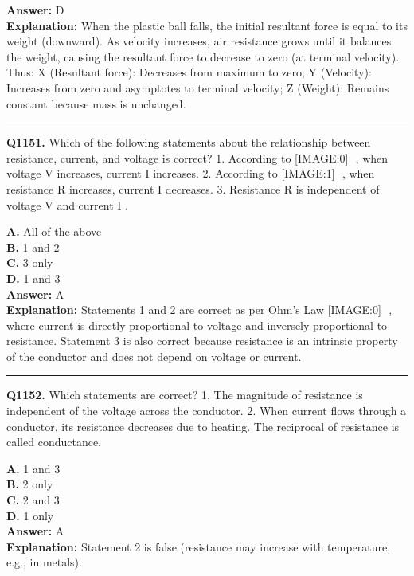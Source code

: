 \documentclass[12pt]{article}
\begin{document}
\textbf{Answer:} D \\
\textbf{Explanation:} When the plastic ball falls, the initial resultant force is equal to its weight (downward). As velocity increases, air resistance grows until it balances the weight, causing the resultant force to decrease to zero (at terminal velocity).
Thus:
X (Resultant force): Decreases from maximum to zero;
Y (Velocity): Increases from zero and asymptotes to terminal velocity;
Z (Weight): Remains constant because mass is unchanged.

\hrule
\vspace{1em}


\noindent
\textbf{Q1151.} Which of the following statements about the relationship between resistance, current, and voltage is correct?
1.
According to
[IMAGE:0]
​
, when voltage
V
increases, current
I
increases.
2.
According to
[IMAGE:1]
​
, when resistance
R
increases, current
I
decreases.
3.
Resistance
R
is independent of voltage
V
and current
I
.



\textbf{A.} All of the above \\
\textbf{B.} 1 and 2 \\
\textbf{C.} 3 only \\
\textbf{D.} 1 and 3 \\

\textbf{Answer:} A \\
\textbf{Explanation:} Statements 1 and 2 are correct as per Ohm's Law
[IMAGE:0]
​
, where current is directly proportional to voltage and inversely proportional to resistance. Statement 3 is also correct because resistance is an intrinsic property of the conductor and does not depend on voltage or current.

\hrule
\vspace{1em}


\noindent
\textbf{Q1152.} Which statements are correct?
1.
The magnitude of resistance is independent of the voltage across the conductor.
2.
When current flows through a conductor, its resistance decreases due to heating.
The reciprocal of resistance is called conductance.



\textbf{A.} 1 and 3 \\
\textbf{B.} 2 only \\
\textbf{C.} 2 and 3 \\
\textbf{D.} 1 only \\

\textbf{Answer:} A \\
\textbf{Explanation:} Statement 2 is false (resistance may increase with temperature, e.g., in metals).
\end{document}
